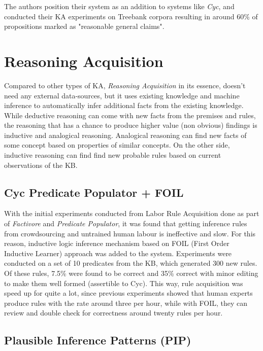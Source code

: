The authors position their system as an addition to systems like \emph{Cyc}, and
conducted their KA experiments on Treebank corpora resulting in around 60\% of
propositions marked as "reasonable general claims"\parencite{Schubert2003}. 

\section{Reasoning Acquisition}
\label{section:r:reasoningacq}
Compared to other types of KA, \emph{Reasoning Acquisition} in its essence,
doesn't need any external data-sources, but it uses existing knowledge and
machine inference to automatically infer additional facts from the existing
knowledge. While deductive reasoning can come with new facts from the premises 
and rules, the reasoning that has a chance to produce higher value (non obvious)
findings is inductive and analogical reasoning. Analogical reasoning can find
new facts of some concept based on properties of similar concepts. On the other
side, inductive reasoning can find find new probable rules based on current 
observations of the KB.

\subsection {Cyc Predicate Populator + FOIL}
With the initial experiments conducted from Labor Rule Acquisition done as part
of \emph{Factivore} and \emph{Predicate Populator}\parencite{Witbrock2005}, it 
was found that getting inference rules from crowdsourcing and untrained
human labour is ineffective and slow. For this reason, inductive logic 
inference mechanism based on FOIL (First Order Inductive Learner) approach
\parencite{Quinlan1995} was added to the system. Experiments were conducted on
a set of 10 predicates from the KB, which generated 300 new rules. Of these
rules, 7.5\% were found to be correct and 35\% correct with minor editing to
make them well formed (assertible to Cyc). This way, rule acquisition was speed
up for quite a lot, since previous experiments showed that human experts produce
rules with the rate around three per hour, while with FOIL, they can review
and double check for correctness around twenty rules per hour.

\subsection {Plausible Inference Patterns (PIP)}

